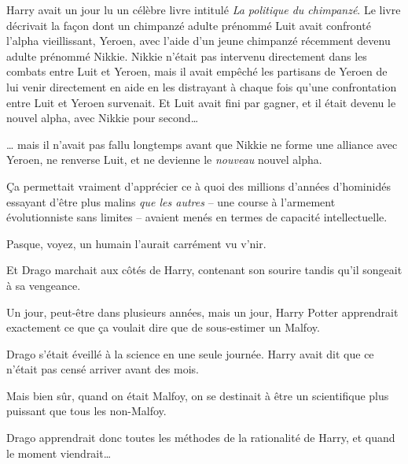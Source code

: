 Harry avait un jour lu un célèbre livre intitulé \emph{La politique du chimpanzé}. Le livre décrivait la façon dont un chimpanzé adulte prénommé Luit avait confronté l'alpha vieillissant, Yeroen, avec l'aide d'un jeune chimpanzé récemment devenu adulte prénommé Nikkie. Nikkie n'était pas intervenu directement dans les combats entre Luit et Yeroen, mais il avait empêché les partisans de Yeroen de lui venir directement en aide en les distrayant à chaque fois qu'une confrontation entre Luit et Yeroen survenait. Et Luit avait fini par gagner, et il était devenu le nouvel alpha, avec Nikkie pour second…

… mais il n'avait pas fallu longtemps avant que Nikkie ne forme une alliance avec Yeroen, ne renverse Luit, et ne devienne le \emph{nouveau} nouvel alpha.

Ça permettait vraiment d'apprécier ce à quoi des millions d'années d'hominidés essayant d'être plus malins \emph{que les autres} -- une course à l'armement évolutionniste sans limites -- avaient menés en termes de capacité intellectuelle.

Pasque, voyez, un humain l'aurait carrément vu v'nir.

\later

Et Drago marchait aux côtés de Harry, contenant son sourire tandis qu'il songeait à sa vengeance.

Un jour, peut-être dans plusieurs années, mais un jour, Harry Potter apprendrait exactement ce que ça voulait dire que de sous-estimer un Malfoy.

Drago s'était éveillé à la science en une seule journée. Harry avait dit que ce n'était pas censé arriver avant des mois.

Mais bien sûr, quand on était Malfoy, on se destinait à être un scientifique plus puissant que tous les non-Malfoy.

Drago apprendrait donc toutes les méthodes de la rationalité de Harry, et quand le moment viendrait…
